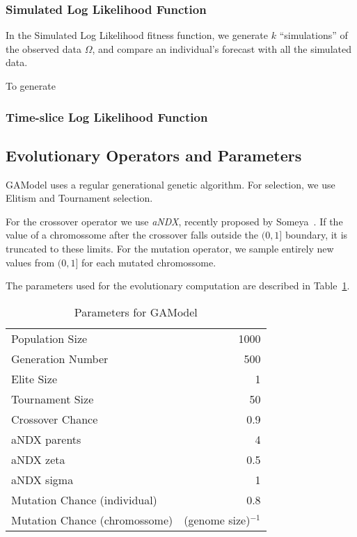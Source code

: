 \documentclass{sig-alternate}
\begin{document}
\subsubsection{Simulated Log Likelihood Function}

In the Simulated Log Likelihood fitness function, we generate $k$
``simulations'' of the observed data $\Omega$, and compare an
individual's forecast with all the simulated data.

To generate 



\subsubsection{Time-slice Log Likelihood Function}


\subsection{Evolutionary Operators and Parameters}

GAModel uses a regular generational genetic algorithm. For selection,
we use Elitism and Tournament selection. 

For the crossover operator we use \emph{aNDX}, recently proposed by
Someya~\cite{Someya2013}. If the value of a chromossome after the
crossover falls outside the $(0,1]$ boundary, it is truncated to these
  limits. For the mutation operator, we sample entirely new values
  from $(0,1]$ for each mutated chromossome.

The parameters used for the evolutionary computation are described in
Table~\ref{GAParameters}. %

\begin{table}[!h]
  \begin{center}
  \begin{tabular}{|l|r|}
    \hline
    Population Size & 1000\\
    Generation Number & 500\\
    Elite Size & 1\\
    Tournament Size & 50\\
    Crossover Chance & 0.9\\
    aNDX parents & 4\\
    aNDX zeta & 0.5\\
    aNDX sigma & 1\\
    Mutation Chance (individual) & 0.8\\
    Mutation Chance (chromossome) & (genome size)$^{-1}$\\
    \hline    
  \end{tabular}
  \end{center}
  \caption{Parameters for GAModel}
  \label{GAParameters}
\end{table}
\end{document}
